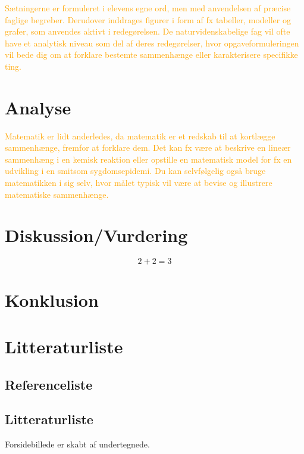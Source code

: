 \documentclass[12pt, a4paper]{article}
\begin{document}
\textcolor{orange}{Sætningerne er formuleret i elevens egne ord, men med anvendelsen af præcise faglige begreber. Derudover inddrages figurer i form af fx tabeller, modeller og grafer, som anvendes aktivt i redegørelsen.
    De naturvidenskabelige fag vil ofte have et analytisk niveau som del af deres redegørelser, hvor opgaveformuleringen vil bede dig om at forklare bestemte sammenhænge eller karakterisere specifikke ting.}
\section{Analyse} %
\textcolor{orange}{Matematik er lidt anderledes, da matematik er et redskab til at kortlægge sammenhænge, fremfor at forklare dem. Det kan fx være at beskrive en lineær sammenhæng i en kemisk reaktion eller opstille en matematisk model for fx en udvikling i en smitsom sygdomsepidemi.  Du kan selvfølgelig også bruge matematikken i sig selv, hvor målet typisk vil være at bevise og illustrere matematiske sammenhænge.}
\section{Diskussion/Vurdering} %
\begin{equation}
    2+2=3
\end{equation}
\section{Konklusion} %

\section{Litteraturliste}
\subsection{Referenceliste}
\printbibliography
\subsection{Litteraturliste}
Forsidebillede er skabt af undertegnede.
\end{document}
